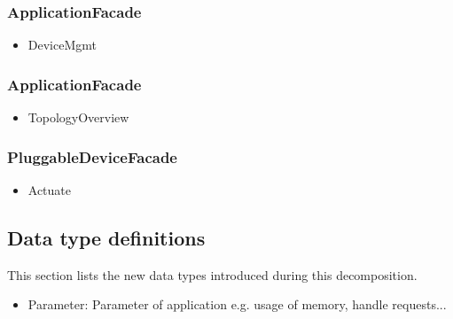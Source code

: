     \subsubsection{ApplicationFacade}
        \begin{itemize}
            \item DeviceMgmt
        \end{itemize}
    \subsubsection{ApplicationFacade}
        \begin{itemize}
            \item TopologyOverview
        \end{itemize}
    \subsubsection{PluggableDeviceFacade}
        \begin{itemize}
            \item Actuate
        \end{itemize}

\subsection{Data type definitions}
    This section lists the new data types introduced during this decomposition.

    \begin{itemize}
        \item Parameter: Parameter of application e.g. usage of memory, handle requests...
    \end{itemize}
